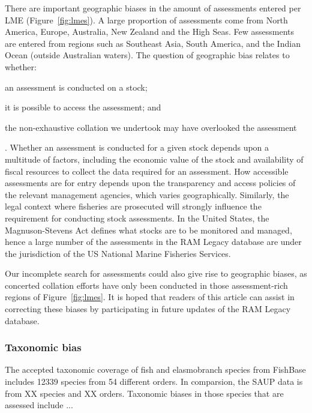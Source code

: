 \documentclass[letterpaper,12pt]{article}
\begin{document}
There are important geographic biases in the amount of assessments
entered per LME (Figure~\ref{fig:lmes}). A large proportion of
assessments come from North America, Europe, Australia, New Zealand
and the High Seas. Few assessments are entered from regions such as
Southeast Asia, South America, and the Indian Ocean (outside
Australian waters). The question of geographic bias relates to
whether: \begin{inparaenum}[1\upshape)] \item an assessment is
  conducted on a stock; \item it is possible to access the assessment;
  and \item the non-exhaustive collation we undertook may have
  overlooked the assessment \end{inparaenum}. Whether an assessment is
conducted for a given stock depends upon a multitude of factors,
including the economic value of the stock and availability of fiscal
resources to collect the data required for an assessment. How
accessible assessments are for entry depends upon the transparency and
access policies of the relevant management agencies, which varies
geographically. Similarly, the legal context where fisheries are
prosecuted will strongly influence the requirement for conducting
stock assessments. In the United States, the Magnuson-Stevens Act
defines what stocks are to be monitored and managed, hence a large
number of the assessments in the RAM Legacy database are under the
jurisdiction of the US National Marine Fisheries Services.

Our incomplete search for assessments could also give rise to
geographic biases, as concerted collation efforts have only been
conducted in those assessment-rich regions of Figure~\ref{fig:lmes}.
It is hoped that readers of this article can assist in correcting
these biases by participating in future updates of the RAM Legacy
database. 

\subsubsection{Taxonomic bias}
The accepted taxonomic coverage of fish and elasmobranch species from
FishBase includes 12339 species from 54 different orders. In comparsion,
the SAUP data is from XX species and XX orders.  Taxonomic biases in
those species that are assessed include ...
\end{document}
